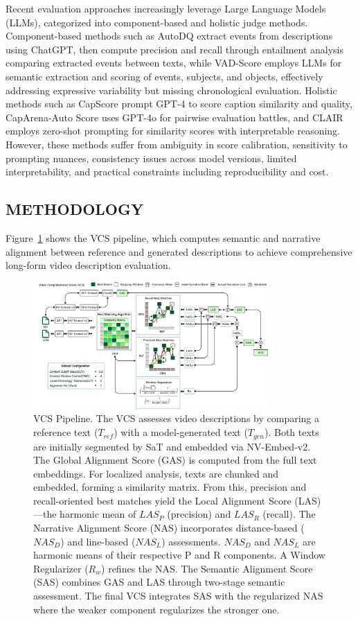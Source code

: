 \documentclass[main.tex]{subfiles}
\begin{document}
Recent evaluation approaches increasingly leverage Large Language Models (LLMs), categorized into component-based and holistic judge methods. Component-based methods such as AutoDQ \cite{wyzs:24} extract events from descriptions using ChatGPT, then compute precision and recall through entailment analysis comparing extracted events between texts, while VAD-Score employs LLMs for semantic extraction and scoring of events, subjects, and objects, effectively addressing expressive variability but missing chronological evaluation. Holistic methods such as CapScore prompt GPT-4 to score caption similarity and quality, CapArena-Auto Score uses GPT-4o for pairwise evaluation battles, and CLAIR \cite{chan:23} employs zero-shot prompting for similarity scores with interpretable reasoning. However, these methods suffer from ambiguity in score calibration, sensitivity to prompting nuances, consistency issues across model versions, limited interpretability, and practical constraints including reproducibility and cost.

\subsection{METHODOLOGY}
\label{sec:methodology_vcs}

Figure~\ref{fig:vcs-architecture} shows the VCS pipeline, which computes semantic and narrative alignment between reference and generated descriptions to achieve comprehensive long-form video description evaluation.

\begin{figure}[t]
\centering
\includegraphics[width=0.8\textwidth]{images/VCS.pdf}
\caption{VCS Pipeline. The VCS assesses video descriptions by comparing a reference text ($T_{ref}$) with a model-generated text ($T_{gen}$). Both texts are initially segmented by SaT and embedded via NV-Embed-v2. The Global Alignment Score (GAS) is computed from the full text embeddings. For localized analysis, texts are chunked and embedded, forming a similarity matrix. From this, precision and recall-oriented best matches yield the Local Alignment Score (LAS)—the harmonic mean of $LAS_P$ (precision) and $LAS_R$ (recall). The Narrative Alignment Score (NAS) incorporates distance-based ($NAS_D$) and line-based ($NAS_L$) assessments. $NAS_D$ and $NAS_L$ are harmonic means of their respective P and R components. A Window Regularizer ($R_w$) refines the NAS. The Semantic Alignment Score (SAS) combines GAS and LAS through two-stage semantic assessment. The final VCS integrates SAS with the regularized NAS where the weaker component regularizes the stronger one.}
\label{fig:vcs-architecture}
\end{figure}
\end{document}
